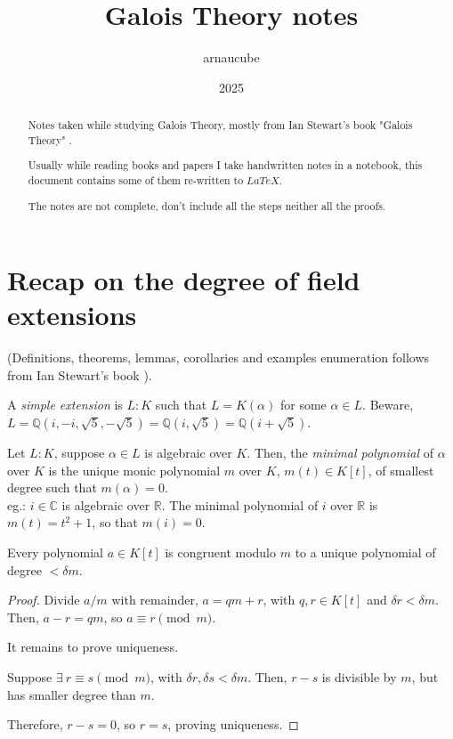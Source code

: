 \documentclass{article}
\title{Galois Theory notes}
\author{arnaucube}
\date{2025}
\theoremstyle{definition}
\newenvironment{defn}[1]
{\renewcommand\theinnerdefn{#1}\innerdefn}
{\endinnerdefn}
\newenvironment{lemma}[1]
{\renewcommand\theinnerlemma{#1}\innerlemma}
{\endinnerlemma}
\newenvironment{eg}[1]
{\renewcommand\theinnereg{#1}\innereg}
{\endinnereg}
\begin{document}
\maketitle

\begin{abstract}
	Notes taken while studying Galois Theory, mostly from Ian Stewart's book "Galois Theory" \cite{ianstewart}.

	Usually while reading books and papers I take handwritten notes in a notebook, this document contains some of them re-written to $LaTeX$.

	The notes are not complete, don't include all the steps neither all the proofs.
\end{abstract}

\tableofcontents

\section{Recap on the degree of field extensions}
(Definitions, theorems, lemmas, corollaries and examples enumeration follows from Ian Stewart's book \cite{ianstewart}).

\begin{defn}{4.10}
  A \emph{simple extension} is $L:K$ such that $L=K(\alpha)$ for some $\alpha \in L$.
\end{defn}
\begin{eg}{4.11}
  Beware, $L=\mathbb{Q}(i, -i, \sqrt{5}, -\sqrt{5}) = \mathbb{Q}(i, \sqrt{5}) = \mathbb{Q}(i+\sqrt{5})$.
\end{eg}

\begin{defn}{5.5}
  Let $L:K$, suppose $\alpha \in L$ is algebraic over $K$. Then, the \emph{minimal polynomial} of $\alpha$ over $K$ is the unique monic polynomial $m$ over $K$, $m(t) \in K[t]$, of smallest degree such that $m(\alpha)=0$.
  \\
  eg.: $i \in \mathbb{C}$ is algebraic over $\mathbb{R}$. The minimal polynomial of $i$ over $\mathbb{R}$ is $m(t)=t^2 +1$, so that $m(i)=0$.
\end{defn}

\begin{lemma}{5.9}
  Every polynomial $a \in K[t]$ is congruent modulo $m$ to a unique polynomial of degree $< \delta m$.
\end{lemma}
\begin{proof}
  Divide $a / m$ with remainder, $a= qm +r$, with $q,r \in K[t]$ and $\delta r < \delta m$.
  Then, $a-r=qm$, so $a \equiv r \pmod{m}$.

  It remains to prove uniqueness.

  Suppose $\exists~ r \equiv s \pmod{m}$, with $\delta r, \delta s < \delta m$.
  Then, $r-s$ is divisible by $m$, but has smaller degree than $m$.

  Therefore, $r-s=0$, so $r=s$, proving uniqueness.
\end{proof}
\end{document}
